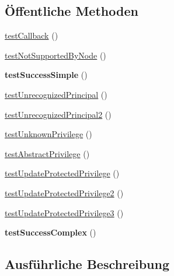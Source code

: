 \subsection*{Öffentliche Methoden}
\begin{DoxyCompactItemize}
\item 
\mbox{\hyperlink{class_sabre_1_1_d_a_v_a_c_l_1_1_a_c_l_method_test_aa9eca051499591344c5da48093d070d4}{test\+Callback}} ()
\item 
\mbox{\hyperlink{class_sabre_1_1_d_a_v_a_c_l_1_1_a_c_l_method_test_ab91c21ba98132bcf673529c61fcecd2a}{test\+Not\+Supported\+By\+Node}} ()
\item 
\mbox{\label{class_sabre_1_1_d_a_v_a_c_l_1_1_a_c_l_method_test_a7c74b99c6b7f4cc6cd642320473f6852}} 
{\bfseries test\+Success\+Simple} ()
\item 
\mbox{\hyperlink{class_sabre_1_1_d_a_v_a_c_l_1_1_a_c_l_method_test_a3f364a3fca9284b4be0bf2c6551c38c6}{test\+Unrecognized\+Principal}} ()
\item 
\mbox{\hyperlink{class_sabre_1_1_d_a_v_a_c_l_1_1_a_c_l_method_test_af8f49457b563796d3b2e2d5248cd3fbc}{test\+Unrecognized\+Principal2}} ()
\item 
\mbox{\hyperlink{class_sabre_1_1_d_a_v_a_c_l_1_1_a_c_l_method_test_a4eff083c6a691af792c8e85c44e9f2f4}{test\+Unknown\+Privilege}} ()
\item 
\mbox{\hyperlink{class_sabre_1_1_d_a_v_a_c_l_1_1_a_c_l_method_test_a95231361d36bc812609571c80bdf8986}{test\+Abstract\+Privilege}} ()
\item 
\mbox{\hyperlink{class_sabre_1_1_d_a_v_a_c_l_1_1_a_c_l_method_test_afb2f71f0758e11a2028b395ea78a9e3c}{test\+Update\+Protected\+Privilege}} ()
\item 
\mbox{\hyperlink{class_sabre_1_1_d_a_v_a_c_l_1_1_a_c_l_method_test_a801d18485247725d9620ebac7ffca58e}{test\+Update\+Protected\+Privilege2}} ()
\item 
\mbox{\hyperlink{class_sabre_1_1_d_a_v_a_c_l_1_1_a_c_l_method_test_af8b2c385cb84c8e16cf1550cf8491679}{test\+Update\+Protected\+Privilege3}} ()
\item 
\mbox{\label{class_sabre_1_1_d_a_v_a_c_l_1_1_a_c_l_method_test_ac94620a386cc5e7bbe72e6396895af27}} 
{\bfseries test\+Success\+Complex} ()
\end{DoxyCompactItemize}


\subsection{Ausführliche Beschreibung}


